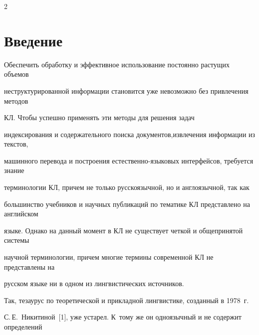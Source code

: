 





      \thispagestyle{headings}



      \begin{multicols}{2}



            \label{st\stat}



\section{Введение}



  Обеспечить обработку и эффективное использование постоянно растущих объемов 

неструктурированной информации становится уже невозможно без привлечения методов 

КЛ. Чтобы успешно приме\-нять эти методы для решения задач 

индексирования и содержательного поиска документов,\linebreak извлече\-ния информации из текстов, 

машинного перевода и построения есте\-ст\-вен\-но-язы\-ко\-вых интерфейсов, требуется знание 

терминологии КЛ, причем не только русскоязычной, но и англоязычной, так как 

большинство учебников и научных публикаций по тематике КЛ представлено на английском 

языке. Однако на данный момент в КЛ не существует четкой и общепринятой системы 

научной терминологии, причем многие термины современной КЛ не представлены на 

русском языке ни в одном из лингвистических источников.

  

  Так, тезаурус по теоретической и прикладной лингвистике, созданный в 1978~г.\ 

С.\,Е.~Никитиной~[1], уже устарел. К~тому же он одноязычный и не содержит определений 


\end{multicols}
